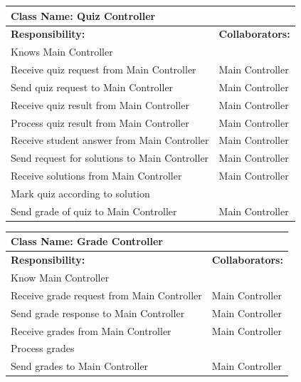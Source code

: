 \documentclass[]{article}
\begin{document}
\begin{enumerate}[a)]
	\begin{table}[ht]
	\centering
		\begin{tabular}{|p{5cm}|p{5cm}|}
		\hline
		 \multicolumn{2}{|l|}{\textbf{Class Name: Quiz Controller}} \\
		\hline
		\textbf{Responsibility:} & \textbf{Collaborators:} \\
		\hline
		Knows Main Controller & \\
		\hline
		Receive quiz request from Main Controller & Main Controller \\
		\hline
		Send quiz request to Main Controller & Main Controller \\
		\hline
		Receive quiz result from Main Controller & Main Controller \\
		\hline
		Process quiz result from Main Controller & Main Controller \\
		\hline
		Receive student answer from Main Controller & Main Controller \\
		\hline
		Send request for solutions to Main Controller & Main Controller \\
		\hline
		Receive solutions from Main Controller & Main Controller \\
		\hline
		Mark quiz according to solution & \\
		\hline
		Send grade of quiz to Main Controller & Main Controller \\
		\hline

		\end{tabular}
	\end{table}


	\begin{table}[ht]
	\centering
		\begin{tabular}{|p{5cm}|p{5cm}|}
		\hline
		 \multicolumn{2}{|l|}{\textbf{Class Name: Grade Controller}} \\
		\hline
		\textbf{Responsibility:} & \textbf{Collaborators:} \\
		\hline
		Know Main Controller \\
		\hline
		Receive grade request from Main Controller & Main Controller \\
		\hline
		Send grade response to Main Controller & Main Controller \\
		\hline
		Receive grades from Main Controller & Main Controller \\
		\hline
		Process grades & \\
		\hline
		Send grades to Main Controller & Main Controller \\
		\hline
		\end{tabular}
	\end{table}


\end{enumerate}
\end{document}
